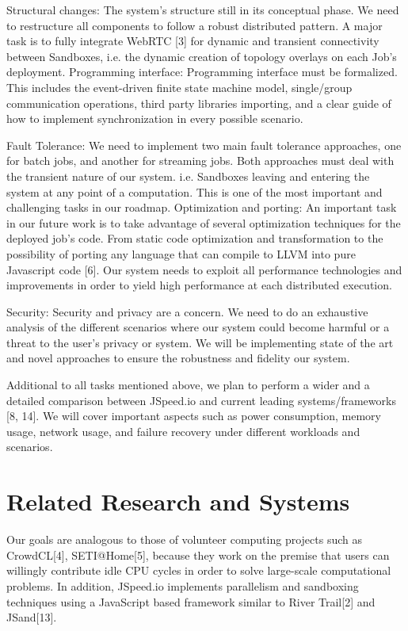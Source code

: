 \documentclass[10pt,reprint]{socc14}
\begin{document}
Structural changes: The system's structure still in its conceptual phase. We need to restructure all components to follow a robust distributed pattern. A major task is to fully integrate WebRTC [3] for dynamic and transient connectivity between Sandboxes, i.e. the dynamic creation of topology overlays on each Job’s deployment.
Programming interface: Programming interface must be formalized. This includes the event-driven finite state machine model, single/group communication operations, third party libraries importing, and a clear guide of how to implement synchronization in every possible scenario.

Fault Tolerance: We need to implement two main fault tolerance approaches, one for batch jobs, and another for  streaming jobs. Both approaches must deal with the transient nature of our system. i.e. Sandboxes leaving and entering the system at any point of a computation. This is one of the most important and challenging tasks in our roadmap.
Optimization and porting: An important task in our future work is to take advantage of several optimization techniques for the deployed job’s code. From static code optimization and transformation to the possibility of porting any language that can compile to  LLVM into pure Javascript code [6]. Our system needs to exploit all performance technologies and improvements in order to yield high performance at each distributed execution.

Security: Security and privacy are a concern. We need to do an exhaustive analysis of the different scenarios where our system could become harmful or a threat to the user’s privacy or system. We will be implementing state of the art and novel approaches to ensure the robustness and fidelity our system.

Additional to all tasks mentioned above, we plan to perform a wider and a detailed comparison between JSpeed.io and current leading systems/frameworks [8, 14]. We will cover important aspects such as power consumption, memory usage, network usage, and failure recovery under different workloads and scenarios.


\section{Related Research and Systems}
Our goals are analogous to those of volunteer computing projects such as CrowdCL[4], SETI@Home[5], because they work on the premise that users can willingly contribute idle CPU cycles in order to solve large-scale computational problems.  In addition, JSpeed.io implements parallelism and sandboxing techniques using a JavaScript based framework similar to River Trail[2] and JSand[13].
\end{document}
